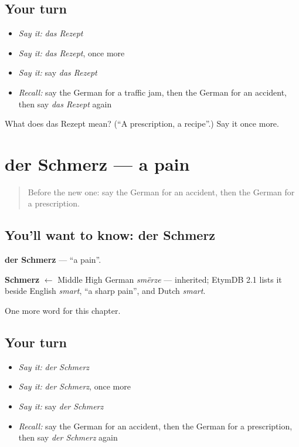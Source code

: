 \subsection*{Your turn}
\begin{itemize}
\raggedright
  \item \emph{Say it:} \emph{das Rezept}
  \item \emph{Say it:} \emph{das Rezept}, once more
  \item \emph{Say it:} say \emph{das Rezept}
  \item \emph{Recall:} say the German for a traffic jam, then the German for an accident, then say \emph{das Rezept} again
\end{itemize}

\begin{tcolorbox}[breakable,colback=teal!4,colframe=teal!35!black,title={Before you move on}]
What does das Rezept mean? (\textquotedblleft{}A prescription, a recipe\textquotedblright{}.) Say it once more.
\end{tcolorbox}
\section[der Schmerz]{der Schmerz — a pain}

\label{lesson:GE-C156-schmerz}



\begin{quote}
Before the new one: say the German for an accident, then the German for a prescription.
\end{quote}

\subsection*{You'll want to know: der Schmerz}
\textbf{der Schmerz} — \textquotedblleft{}a pain\textquotedblright{}.

\begin{cousinweb}
\textbf{Schmerz} $\leftarrow$ Middle High German \emph{smërze} — inherited; EtymDB 2.1 lists it beside English \emph{smart}, \textquotedblleft{}a sharp pain\textquotedblright{}, and Dutch \emph{smart}.
\end{cousinweb}

\begin{grammarlens}[title={What you've built}]
One more word for this chapter.
\end{grammarlens}

\subsection*{Your turn}
\begin{itemize}
\raggedright
  \item \emph{Say it:} \emph{der Schmerz}
  \item \emph{Say it:} \emph{der Schmerz}, once more
  \item \emph{Say it:} say \emph{der Schmerz}
  \item \emph{Recall:} say the German for an accident, then the German for a prescription, then say \emph{der Schmerz} again
\end{itemize}

